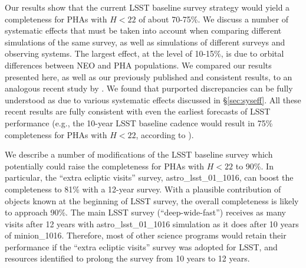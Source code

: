 Our results show that the current LSST baseline survey strategy would yield a completeness for PHAs
with $H<22$ of about 70-75\%. We discuss a number of systematic effects that must be taken into
account when comparing different simulations of the same survey, as well as simulations of different
surveys and observing systems. The largest effect, at the level of 10-15\%, is due to orbital differences
between NEO and PHA populations. We compared our results presented here, as well as our previously
published and consistent results, to an analogous recent study by \citet[]{GMS2016}. We found that
purported discrepancies can be fully understood as due to various systematic effects discussed in
\S\ref{sec:syseff}. All these recent results are fully consistent with even the earliest forecasts of LSST
performance (e.g., the 10-year LSST baseline cadence would result in 75\% completeness for PHAs
with $H<22$, according to \citealt{IvezicNEO2007}).

We describe a number of modifications of the LSST baseline survey which potentially could raise the
completeness for PHAs with $H<22$ to 90\%. In particular, the ``extra ecliptic visits'' survey,
astro\_lsst\_01\_1016, can boost the completeness to 81\% with a 12-year survey. With a plausible
contribution of objects known at the beginning of LSST survey, the overall completeness is likely
to approach 90\%. The main LSST survey (``deep-wide-fast'') receives as many visits after 12 years
with astro\_lsst\_01\_1016 simulation as it does after 10 years of minion\_1016. Therefore,
most of other science programs would retain their performance if the ``extra ecliptic visits'' survey
was adopted for LSST, and resources identified to prolong the survey from 10 years to 12 years.
